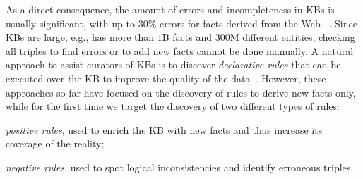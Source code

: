 As a direct consequence, the amount of errors and incompleteness in KBs is usually significant, with up to 30\% errors for facts derived from the Web%
~\cite{abedjan2015temporal,suchanek2009sofie}.
Since KBs are large, e.g., \wikidata has more than $1$B facts and $300$M different entities, %
checking all triples to find errors or to add new facts cannot be done manually. %
A natural approach to assist curators of KBs is to discover %
\emph{declarative rules} that can be executed over the KB to improve the quality of the data~\cite{Chen:2016,abedjan2014amending,galarraga2015fast}. However, these approaches so far have focused on the discovery of rules to derive new facts only, while for the first time
we target the discovery %
of two different types of rules:
\begin{inparaenum}[\itshape(i)]
	\item {\em positive rules}, used to enrich the KB with new facts and thus increase its coverage of the reality;
	\item {\em negative rules}, used to spot logical inconsistencies and identify erroneous triples.
\end{inparaenum}

